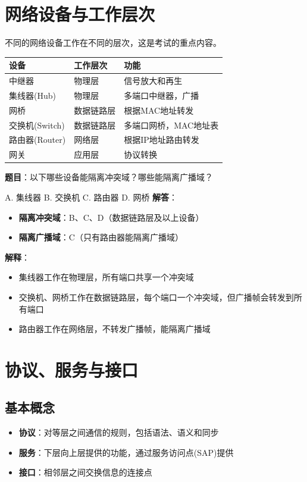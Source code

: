 \section{网络设备与工作层次}
不同的网络设备工作在不同的层次，这是考试的重点内容。

\begin{table}[htbp]
\centering
\begin{tabular}{lll}
\toprule
\textbf{设备} & \textbf{工作层次} & \textbf{功能} \\
\midrule
中继器 & 物理层 & 信号放大和再生 \\
集线器(Hub) & 物理层 & 多端口中继器，广播 \\
网桥 & 数据链路层 & 根据MAC地址转发 \\
交换机(Switch) & 数据链路层 & 多端口网桥，MAC地址表 \\
路由器(Router) & 网络层 & 根据IP地址路由转发 \\
网关 & 应用层 & 协议转换 \\
\bottomrule
\end{tabular}
\end{table}

\begin{examplebox}[例题1.4 设备工作层次]
\textbf{题目}：以下哪些设备能隔离冲突域？哪些能隔离广播域？

A. 集线器  B. 交换机  C. 路由器  D. 网桥
\tcblower
\textbf{解答}：
\begin{itemize}[itemsep=0pt]
    \item \textbf{隔离冲突域}：B、C、D（数据链路层及以上设备）
    \item \textbf{隔离广播域}：C（只有路由器能隔离广播域）
\end{itemize}

\textbf{解释}：
\begin{itemize}[itemsep=0pt]
    \item 集线器工作在物理层，所有端口共享一个冲突域
    \item 交换机、网桥工作在数据链路层，每个端口一个冲突域，但广播帧会转发到所有端口
    \item 路由器工作在网络层，不转发广播帧，能隔离广播域
\end{itemize}
\end{examplebox}

\section{协议、服务与接口}
\subsection{基本概念}
\begin{itemize}[leftmargin=2em,itemsep=0pt]
    \item \textbf{协议}：对等层之间通信的规则，包括语法、语义和同步
    \item \textbf{服务}：下层向上层提供的功能，通过服务访问点(SAP)提供
    \item \textbf{接口}：相邻层之间交换信息的连接点
\end{itemize}

